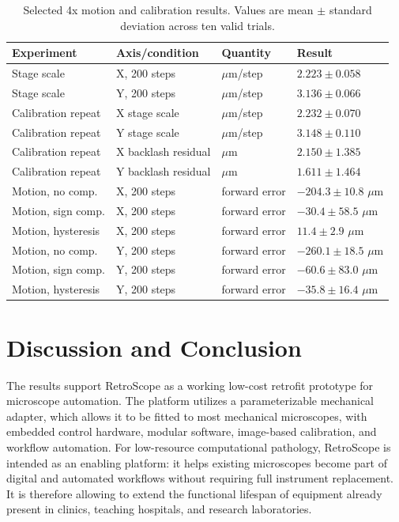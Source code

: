 \documentclass[runningheads]{llncs}
\begin{document}
\begin{table}[h]
\caption{Selected 4x motion and calibration results. Values are mean $\pm$ standard deviation across ten valid trials.}
\label{tab:motion}
\centering
\small
\setlength{\tabcolsep}{6pt}
\begin{tabular}{llll}
\hline
Experiment & Axis/condition & Quantity & Result \\
\hline
Stage scale & X, 200 steps & $\mu$m/step & $2.223\pm0.058$ \\
Stage scale & Y, 200 steps & $\mu$m/step & $3.136\pm0.066$ \\
Calibration repeat & X stage scale & $\mu$m/step & $2.232\pm0.070$ \\
Calibration repeat & Y stage scale & $\mu$m/step & $3.148\pm0.110$ \\
Calibration repeat & X backlash residual & $\mu$m & $2.150\pm1.385$ \\
Calibration repeat & Y backlash residual & $\mu$m & $1.611\pm1.464$ \\
Motion, no comp. & X, 200 steps & forward error & $-204.3\pm10.8$ $\mu$m \\
Motion, sign comp. & X, 200 steps & forward error & $-30.4\pm58.5$ $\mu$m \\
Motion, hysteresis & X, 200 steps & forward error & $11.4\pm2.9$ $\mu$m \\
Motion, no comp. & Y, 200 steps & forward error & $-260.1\pm18.5$ $\mu$m \\
Motion, sign comp. & Y, 200 steps & forward error & $-60.6\pm83.0$ $\mu$m \\
Motion, hysteresis & Y, 200 steps & forward error & $-35.8\pm16.4$ $\mu$m \\
\hline
\end{tabular}
\end{table}

\section{Discussion and Conclusion}

The results support RetroScope as a working low-cost retrofit prototype for microscope automation. The platform utilizes a parameterizable mechanical adapter, which allows it to be fitted to most mechanical microscopes, with embedded control hardware, modular software, image-based calibration, and workflow automation. For low-resource computational pathology, RetroScope is intended as an enabling platform: it helps existing microscopes become part of digital and automated workflows without requiring full instrument replacement. It is therefore allowing to extend the functional lifespan of equipment already present in clinics, teaching hospitals, and research laboratories.
\end{document}
